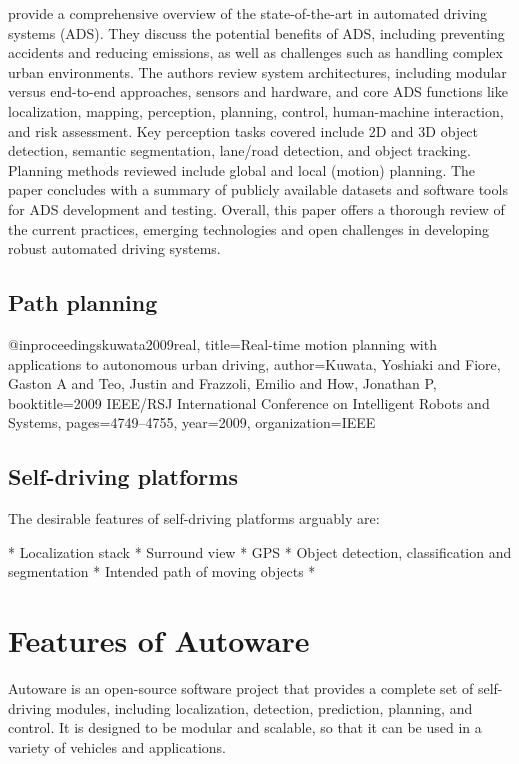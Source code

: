 \cite{Yurtsever_2020} provide a comprehensive overview of the state-of-the-art in automated driving systems (ADS). They discuss the potential benefits of ADS, including preventing accidents and reducing emissions, as well as challenges such as handling complex urban environments. The authors review system architectures, including modular versus end-to-end approaches, sensors and hardware, and core ADS functions like localization, mapping, perception, planning, control, human-machine interaction, and risk assessment. Key perception tasks covered include 2D and 3D object detection, semantic segmentation, lane/road detection, and object tracking. Planning methods reviewed include global and local (motion) planning. The paper concludes with a summary of publicly available datasets and software tools for ADS development and testing. Overall, this paper offers a thorough review of the current practices, emerging technologies and open challenges in developing robust automated driving systems.

\subsection{Path planning}

@inproceedings{kuwata2009real,
  title={Real-time motion planning with applications to autonomous urban driving},
  author={Kuwata, Yoshiaki and Fiore, Gaston A and Teo, Justin and Frazzoli, Emilio and How, Jonathan P},
  booktitle={2009 IEEE/RSJ International Conference on Intelligent Robots and Systems},
  pages={4749--4755},
  year={2009},
  organization={IEEE}
}

\subsection{Self-driving platforms}

The desirable features of self-driving platforms arguably are:

* Localization stack
* Surround view
* GPS
* Object detection, classification and segmentation
* Intended path of moving objects
* 

\section{Features of Autoware}

Autoware is an open-source software project that provides a complete set of self-driving modules, including localization, detection, prediction, planning, and control. It is designed to be modular and scalable, so that it can be used in a variety of vehicles and applications.


